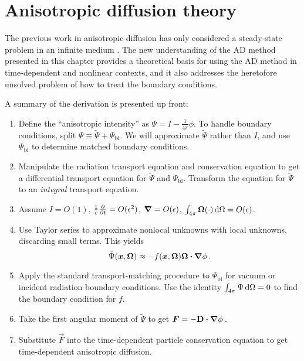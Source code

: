 
\chapter{Anisotropic diffusion theory}

The previous work in anisotropic diffusion has only considered a steady-state
problem in an infinite medium \cite{Lar2009c,Mor2007}. The new understanding of
the AD method presented in this chapter provides a theoretical basis for
using the AD method in time-dependent and nonlinear contexts, and it also
addresses the heretofore unsolved problem of how to treat the boundary
conditions.

A summary of the derivation is presented up front:
\prelistpar\begin{enumerate}
  \item Define the ``anisotropic intensity'' as $\Psi = I - \frac{1}{4\pi}\phi$.
    To handle boundary conditions, split  $\Psi \equiv \tilde \Psi +
    \Psi_\mathrm{bl}$. We will approximate $\tilde \Psi$ rather than $I$, and
    use $\Psi_\mathrm{bl}$ to determine matched boundary conditions.
  \item Manipulate the radiation transport equation and conservation equation to
    get a differential transport equation for $\tilde \Psi$ and
    $\Psi_\mathrm{bl}$.  Transform the equation for $\tilde \Psi$ to an
    \emph{integral} transport equation.
  \item Assume $I=O(1)$, $\frac1c\frac{\partial }{\partial t}=O(\epsilon^2)$, $\bm{\nabla} =
    O(\epsilon)$, $\int_{4\pi} \bm{\Omega} (\cdot) \mathop{}\!\mathrm{d}\Omega = O(\epsilon)$.
  \item Use Taylor series to approximate nonlocal unknowns with local
    unknowns, discarding small terms. This yields
    \begin{equation*}
      \tilde \Psi(\bm{x}, \bm{\Omega})
      \approx - f(\bm{x}, \bm{\Omega})  \bm{\Omega} \bm{\cdot} \bm{\nabla} \phi\,.
    \end{equation*}
  \item Apply the standard transport-matching procedure to $\Psi_\mathrm{bl}$
    for vacuum or incident radiation boundary conditions. Use
    the identity $\int_{4\pi} \Psi \mathop{}\!\mathrm{d}\Omega=0$ to find the boundary condition
    for $f$.
  \item Take the first angular moment of $\tilde \Psi$ to get
    $\bm{F}=-\mathbf{D} \bm{\cdot} \bm{\nabla} \phi$\,.
  \item Substitute $\vec{F}$ into the time-dependent particle
    conservation equation to get time-dependent anisotropic diffusion.
\end{enumerate}

